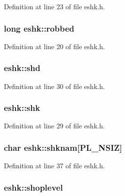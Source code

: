 Definition at line 23 of file eshk.\+h.

\hypertarget{structeshk_abf2d0c23f1ad51c4e8eddb4ee9214b09}{
\subsubsection[{robbed}]{\setlength{\rightskip}{0pt plus 5cm}long eshk\+::robbed}}\label{structeshk_abf2d0c23f1ad51c4e8eddb4ee9214b09}


Definition at line 20 of file eshk.\+h.

\hypertarget{structeshk_ad7e4387c966a39ba064845f5f0934465}{
\subsubsection[{shd}]{ eshk\+::shd}}\label{structeshk_ad7e4387c966a39ba064845f5f0934465}


Definition at line 30 of file eshk.\+h.

\hypertarget{structeshk_a93c0f1e37adb65084af66a2accd8403e}{
\subsubsection[{shk}]{ eshk\+::shk}}\label{structeshk_a93c0f1e37adb65084af66a2accd8403e}


Definition at line 29 of file eshk.\+h.

\hypertarget{structeshk_af7e8849c162c01c2a1366bb0511f2dbb}{
\subsubsection[{shknam}]{\setlength{\rightskip}{0pt plus 5cm}char eshk\+::shknam\mbox{[}{\bf P\+L\+\_\+\+N\+S\+I\+Z}\mbox{]}}}\label{structeshk_af7e8849c162c01c2a1366bb0511f2dbb}


Definition at line 37 of file eshk.\+h.

\hypertarget{structeshk_a18bd83a844e4ff4f23299b789220feba}{
\subsubsection[{shoplevel}]{ eshk\+::shoplevel}}\label{structeshk_a18bd83a844e4ff4f23299b789220feba}



